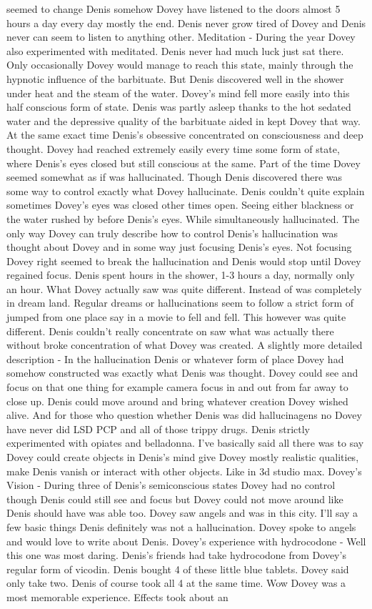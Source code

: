 \documentclass[12pt]{book}
\begin{document}
seemed to change Denis somehow Dovey have listened to the doors almost 5 hours a day every day mostly the end. Denis never grow tired of Dovey and Denis never can seem to listen to anything other. Meditation - During the year Dovey also experimented with meditated. Denis never had much luck just sat there. Only occasionally Dovey would manage to reach this state, mainly through the hypnotic influence of the barbituate. But Denis discovered well in the shower under heat and the steam of the water. Dovey's mind fell more easily into this half conscious form of state. Denis was partly asleep thanks to the hot sedated water and the depressive quality of the barbituate aided in kept Dovey that way. At the same exact time Denis's obsessive concentrated on consciousness and deep thought. Dovey had reached extremely easily every time some form of state, where Denis's eyes closed but still conscious at the same. Part of the time Dovey seemed somewhat as if was hallucinated. Though Denis discovered there was some way to control exactly what Dovey hallucinate. Denis couldn't quite explain sometimes Dovey's eyes was closed other times open. Seeing either blackness or the water rushed by before Denis's eyes. While simultaneously hallucinated. The only way Dovey can truly describe how to control Denis's hallucination was thought about Dovey and in some way just focusing Denis's eyes. Not focusing Dovey right seemed to break the hallucination and Denis would stop until Dovey regained focus. Denis spent hours in the shower, 1-3 hours a day, normally only an hour. What Dovey actually saw was quite different. Instead of was completely in dream land. Regular dreams or hallucinations seem to follow a strict form of jumped from one place say in a movie to fell and fell. This however was quite different. Denis couldn't really concentrate on saw what was actually there without broke concentration of what Dovey was created. A slightly more detailed description - In the hallucination Denis or whatever form of place Dovey had somehow constructed was exactly what Denis was thought. Dovey could see and focus on that one thing for example camera focus in and out from far away to close up. Denis could move around and bring whatever creation Dovey wished alive. And for those who question whether Denis was did hallucinagens no Dovey have never did LSD PCP and all of those trippy drugs. Denis strictly experimented with opiates and belladonna. I've basically said all there was to say Dovey could create objects in Denis's mind give Dovey mostly realistic qualities, make Denis vanish or interact with other objects. Like in 3d studio max. Dovey's Vision - During three of Denis's semiconscious states Dovey had no control though Denis could still see and focus but Dovey could not move around like Denis should have was able too. Dovey saw angels and was in this city. I'll say a few basic things Denis definitely was not a hallucination. Dovey spoke to angels and would love to write about Denis. Dovey's experience with hydrocodone - Well this one was most daring. Denis's friends had take hydrocodone from Dovey's regular form of vicodin. Denis bought 4 of these little blue tablets. Dovey said only take two. Denis of course took all 4 at the same time. Wow Dovey was a most memorable experience. Effects took about an 
\end{document}
